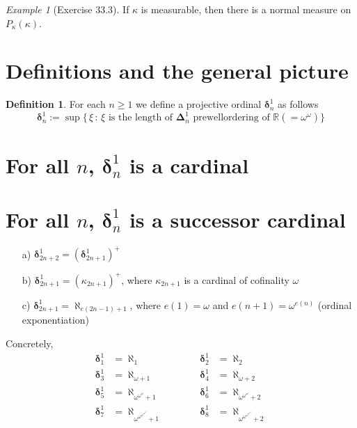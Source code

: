 \documentclass[bibother]{asl}
\theoremstyle{definition}
\newtheorem{defn}[thm]{Definition}
\theoremstyle{remark}
\newtheorem*{example}{Example}
\newcommand{\bd}{\boldsymbol{\delta}}
\newcommand{\bD}{\boldsymbol{\Delta}}
\newcommand{\R}{{\mathbb{R}}}
\begin{document}
\begin{example}[Exercise 33.3]
If $\kappa$ is measurable, then there is a normal measure on $P_\kappa(\kappa)$.
\end{example}












\newpage

\section{Definitions and the general picture}  \label{introduction}

\begin{defn}
For each $n\ge 1$ we define a projective ordinal $\bd^1_n$ as follows
$$\bd^1_n:=\sup\{\, \xi \, : \, \xi \textrm{ is the length of }    \bD^1_n \textrm{ prewellordering of } \R (=\omega^\omega)
\}$$
\end{defn}




\section{For all $n$, $\bd^1_n$ is a cardinal}


\section{For all $n$, $\bd^1_n$ is a successor cardinal}
\begin{itemize}
\item[a) ]
$\bd^1_{2n+2}=(\bd^1_{2n+1})^+$
\item[b) ]
$\bd^1_{2n+1}=(\kappa_{2n+1})^+$, where $\kappa_{2n+1}$ is a cardinal of cofinality $\omega$
\item[c) ]
$\bd^1_{2n+1}=\aleph_{e(2n-1)+1}$, where $e(1)=\omega$ and $e(n+1)=\omega^{e(n)}$ (ordinal exponentiation)
\end{itemize}

Concretely,
\begin{align*}
\bd^1_{1}&=\aleph_1 \qquad\qquad  & \bd^1_{2}&=\aleph_2 \\
\bd^1_{3}&=\aleph_{\omega+1}
\qquad\qquad
& \bd^1_{4}&=\aleph_{\omega+2}\\
%
\bd^1_{5}&=\aleph_{\omega^{\omega^\omega}+1} & 
\bd^1_{6}&=\aleph_{\omega^{\omega^\omega}+2}\\
%
\bd^1_{7}&=\aleph_{\omega^{\omega^{\omega^{\omega^\omega}}}+1} & 
\bd^1_{8}&=\aleph_{\omega^{\omega^{\omega^{\omega^\omega}}}+2}
\end{align*}
\end{document}
